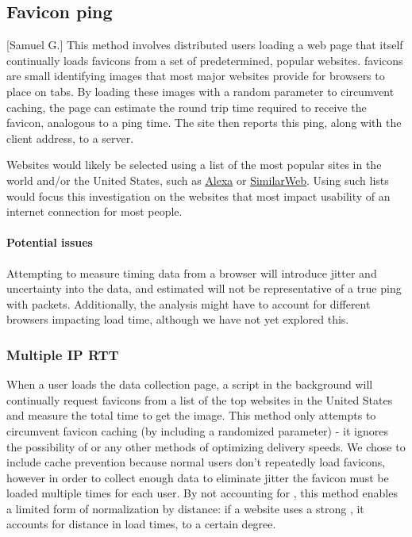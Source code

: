 \subsection{Favicon ping}[Samuel G.]
This method involves distributed users loading a web page that itself continually loads \glspl{favicon} from a set of predetermined, popular websites. favicons are small identifying images that most major websites provide for browsers to place on tabs. By loading these images with a random parameter to circumvent caching, the page can estimate the round trip time required to receive the favicon, analogous to a ping time. The site then reports this ping, along with the client \ip address, to a server.

Websites would likely be selected using a list of the most popular sites in the world and/or the United States, such as \href{www.alexa.com/topsites}{Alexa} or \href{www.similarweb.com/top-websites}{SimilarWeb}. Using such lists would focus this investigation on the websites that most impact usability of an internet connection for most people.

\paragraph{Potential issues}
Attempting to measure timing data from a browser will introduce jitter and uncertainty into the data, and estimated \rtts will not be representative of a true ping with \icmp packets. Additionally, the analysis might have to account for different browsers impacting load time, although we have not yet explored this.

\subsubsection{Multiple IP RTT}
When a user loads the data collection page, a script in the background will continually request favicons from a list of the top websites in the United States and measure the total time to get the image. This method only attempts to circumvent favicon caching (by including a randomized parameter) - it ignores the possibility of \cdns or any other methods of optimizing delivery speeds. We chose to include cache prevention because normal users don't repeatedly load favicons, however in order to collect enough data to eliminate jitter the favicon must be loaded multiple times for each user. By not accounting for \cdns, this method enables a limited form of normalization by distance: if a website uses a strong \cdn, it accounts for distance in load times, to a certain degree.

